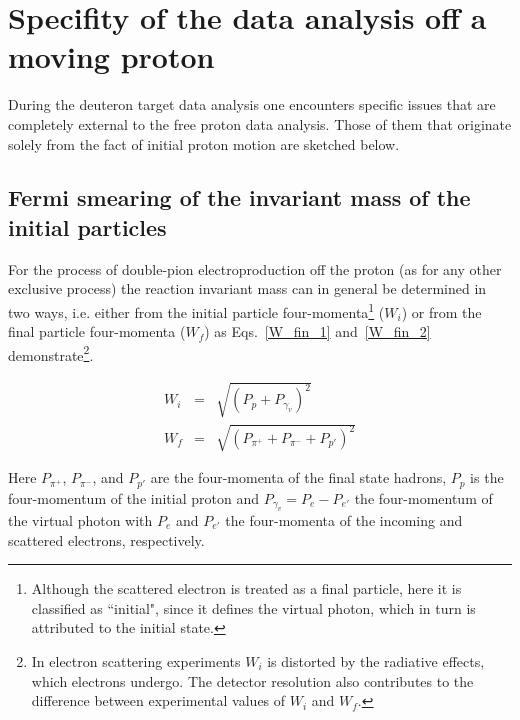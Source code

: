 

\newpage
\chapter{Specifity of the data analysis off a moving proton}
\label{sec:data_an_on_mov_p}
\mbox{}\vspace{-\baselineskip}

During the deuteron target data analysis one encounters specific issues that are completely external to the free proton data analysis. Those of them that originate solely from the fact of initial proton motion are sketched below.  


\section{Fermi smearing of the invariant mass of the initial particles}

For the process of double-pion electroproduction off the proton (as for any other exclusive process) the reaction invariant mass can in general be determined in two ways, i.e. either from the initial particle  four-momenta\footnote[1]{Although the scattered electron is treated as a final particle, here it is classified as ``initial", since it defines the virtual photon, which in turn is attributed to the initial state.} ($W_{i}$) or from the final particle  four-momenta ($W_{f}$) as Eqs.~\eqref{W_fin_1} and~\eqref{W_fin_2} demonstrate\footnote[2]{In electron scattering experiments $W_{i}$ is distorted by the radiative effects, which electrons undergo. The detector resolution also contributes to the difference between experimental values of $W_{i}$ and $W_{f}$.}. 


\begin{eqnarray}
W_{i}&= & \sqrt{(P_{p}+P_{\gamma_{v}})^{2}} \label{W_fin_1} \\
W_{f}&= & \sqrt{(P_{\pi^{+}}+P_{\pi^{-}}+P_{p'})^{2}} \label{W_fin_2}
\end{eqnarray}

Here $P_{\pi^{+}}$, $P_{\pi^{-}}$, and $P_{p'}$ are the four-momenta of the final state hadrons, $P_{p}$ is the four-momentum of the initial proton and $P_{\gamma_{v}}=P_{e}-P_{e'}$ the four-momentum of the virtual photon with $P_{e}$ and $P_{e'}$ the four-momenta of the incoming and scattered electrons, respectively. 


